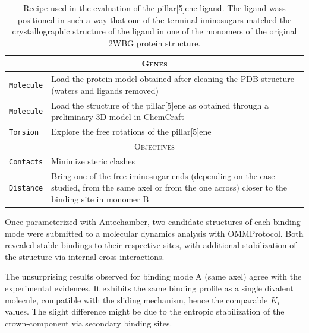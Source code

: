 \begin{table}[hbtp]
	\caption[Pillar-5-ene recipe]{Recipe used in the evaluation of the pillar[5]ene ligand. The ligand wass positioned in such a way that one of the terminal iminosugars matched the crystallographic structure of the ligand in one of the monomers of the original 2WBG protein structure.}
	\label{table:recipe-rotaxane}
	\footnotesize
	\newcommand{\tableheading}[1]{\multicolumn{2}{c}{\textsc{#1}}}
	\begin{tabularx}{\textwidth}{RL}
		\toprule
		\tableheading{Genes}\\
		\toprule
		\texttt{Molecule} & Load the protein model obtained after cleaning the PDB structure\cite{pdb:2wbg} (waters and ligands removed) \\
		\midrule
		\texttt{Molecule} & Load the structure of the pillar[5]ene as obtained through a preliminary 3D model in ChemCraft \\
		\midrule
		\texttt{Torsion} & Explore the free rotations of the pillar[5]ene \\
		\toprule
		\tableheading{Objectives}\\
		\toprule
		\texttt{Contacts} & Minimize steric clashes \\
		\midrule
		\texttt{Distance} & Bring one of the free iminosugar ends (depending on the case studied, from the same axel or from the one across) closer to the binding site in monomer B \\

		\bottomrule

	\end{tabularx}
\end{table}

Once parameterized with Antechamber,\cite{wang2001antechamber} two candidate structures of each binding mode were submitted to a molecular dynamics analysis with OMMProtocol. Both revealed stable bindings to their respective sites, with additional stabilization of the structure via internal cross-interactions.

The unsurprising results observed for binding mode A (same axel) agree with the experimental evidences. It exhibits the same binding profile as a single divalent molecule, compatible with the sliding mechanism, hence the comparable $K_{i}$ values. The slight difference might be due to the entropic stabilization of the crown-component via secondary binding sites.

